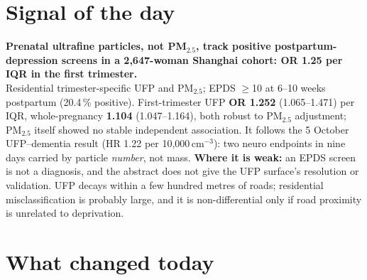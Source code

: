 \documentclass[10pt]{article}
\begin{document}
\vspace{6mm}

\section*{\sffamily\bfseries\color{Deep}Signal of the day}
\vspace{-1.5mm}{\color{Amber}\rule{\linewidth}{1.1pt}}\vspace{2.5mm}

\begin{keybox}
{\sffamily\bfseries\small\color{Deep}Prenatal ultrafine particles, not PM$_{2.5}$, track positive
postpartum-depression screens in a 2,647-woman Shanghai cohort: OR 1.25 per IQR in the first trimester.}\\[1.4mm]
\footnotesize
Residential trimester-specific UFP and PM$_{2.5}$; EPDS $\geq$10 at 6--10 weeks postpartum (20.4\,\% positive).
First-trimester UFP \textbf{OR 1.252} (1.065--1.471) per IQR, whole-pregnancy \textbf{1.104} (1.047--1.164), both
robust to PM$_{2.5}$ adjustment; PM$_{2.5}$ itself showed no stable independent association. It follows the 5
October UFP--dementia result (HR 1.22 per 10,000\,cm$^{-3}$): two neuro endpoints in nine days carried by
particle \textit{number}, not mass.
\textbf{Where it is weak:} an EPDS screen is not a diagnosis, and the abstract does not give the UFP surface's
resolution or validation. UFP decays within a few hundred metres of roads; residential misclassification is
probably large, and it is non-differential only if road proximity is unrelated to deprivation.\par
\end{keybox}

\vspace{3mm}

\section*{\sffamily\bfseries\color{Deep}What changed today}
\vspace{-1.5mm}{\color{Amber}\rule{\linewidth}{1.1pt}}\vspace{2.5mm}
\end{document}
